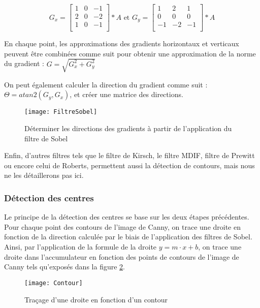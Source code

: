 $$G_x = 
\begin{bmatrix}
	1 & 0 & -1 \\
	2 & 0 & -2 \\
	1 & 0 & -1 \\
\end{bmatrix}
* A \text{ et } G_y =
\begin{bmatrix}
	1 & 2 & 1 \\
	0 & 0 & 0 \\
	-1 & -2 & -1 \\
\end{bmatrix}
* A
$$

En chaque point, les approximations des gradients horizontaux et verticaux peuvent être combinées comme suit pour obtenir une approximation de la norme du gradient : $G = \sqrt{G_x^2 + G_y^2}$

On peut également calculer la direction du gradient comme suit : $\Theta = atan2(G_y, G_x)$, et créer une matrice des directions.

\begin{figure}[h]
  \centering
  \texttt{[image: FiltreSobel]}
  \caption{Déterminer les directions des gradients à partir de l’application du filtre de Sobel}
  \label{fig:FiltreSobel}
\end{figure}

Enfin, d’autres filtres tels que le filtre de Kirsch, le filtre MDIF, filtre de Prewitt ou encore celui de Roberts, permettent aussi la détection de contours, mais nous ne les détaillerons pas ici.

\subsubsection{Détection des centres}

Le principe de la détection des centres se base sur les deux étapes précédentes. Pour chaque point des contours de l’image de Canny, on trace une droite en fonction de la direction calculée par le biais de l’application des filtres de Sobel. Ainsi, par l’application de la formule de la droite $y = m \cdot x + b$, on trace une droite dans l’accumulateur en fonction des points de contours de l’image de Canny tels qu’exposés dans la figure \ref{fig:Contour}.

\begin{figure}[h]
  \centering
  \texttt{[image: Contour]}
  \caption{Traçage d’une droite en fonction d’un contour}
  \label{fig:Contour}
\end{figure}


